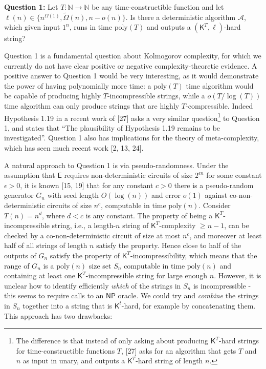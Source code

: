 \textbf{Question 1:} Let $T:\mathbb{N}\rightarrow\mathbb{N}$ be any time-constructible function and let $\ell(n)\in\{n^{\Omega(1)},\tilde{\Omega}(n),n-o(n)\}$. Is there a deterministic algorithm $\mathcal{A}$, which given input $1^{n}$, runs in time $\mathrm{poly}(T)$ and outputs a $({\mathsf{K}}^{T},\ell)$-hard string? 

Question 1 is a fundamental question about Kolmogorov complexity, for which we currently do not have clear positive or negative complexity-theoretic evidence. A positive answer to Question 1 would be very interesting, as it would demonstrate the power of having polynomially more time: a $\mathrm{poly}(T)$ time algorithm would be capable of producing highly $T$-incompressible strings, while a $o(T/\log(T))$ time algorithm can only produce strings that are highly $T$-compressible. Indeed Hypothesis 1.19 in a recent work of [27] asks a very similar question\footnote{The difference is that instead of only asking about producing ${\mathsf{K}}^{T}$-hard strings for time-constructible functions $T$, [27] asks for an algorithm that gets $T$ and $n$ as input in unary, and outputs a ${\mathsf{K}}^{T}$-hard string of length $n$.} to Question 1, and states that “The plausibility of Hypothesis 1.19 remains to be investigated”. Question 1 also has implications for the theory of meta-complexity, which has seen much recent work [2, 13, 24].\par




A natural approach to Question 1 is via pseudo-randomness. Under the assumption that ${\mathsf{E}}$ requires non-deterministic circuits of size $2^{\epsilon n}$ for some constant $\epsilon>0$, it is known [15, 19] that for any constant $c>0$ there is a pseudo-random generator $G_{n}$ with seed length $O(\log(n))$ and error $o(1)$ against co-non-deterministic circuits of size $n^{c}$, computable in time $\mathrm{poly}(n)$. Consider $T(n)=n^{d}$, where $d<c$ is any constant. The property of being a ${\mathsf{K}}^{T}$-incompressible string, i.e., a length-$n$ string of ${\mathsf{K}}^{T}$-complexity $\geq n-1$, can be checked by a co-non-deterministic circuit of size at most $n^{c}$, and moreover at least half of all strings of length $n$ satisfy the property. Hence close to half of the outputs of $G_{n}$ satisfy the property of ${\mathsf{K}}^{T}$-incompressibility, which means that the range of $G_{n}$ is a $\mathrm{poly}(n)$ size set $S_{n}$ computable in time $\mathrm{poly}(n)$ and containing at least one ${\mathsf{K}}^{T}$-incompressible string for large enough $n$. However, it is unclear how to identify efficiently \emph{which} of the strings in $S_{n}$ is incompressible - this seems to require calls to an ${\mathsf{NP}}$ oracle. We could try and \emph{combine} the strings in $S_{n}$ together into a string that is ${\mathsf{K}}^{t}$-hard, for example by concatenating them. This approach has two drawbacks:\par


